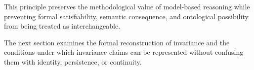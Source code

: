 This principle preserves the methodological value
of model-based reasoning while preventing formal
satisfiability, semantic consequence, and ontological
possibility from being treated as interchangeable.

The next section examines the formal reconstruction
of invariance and the conditions under which
invariance claims can be represented without
confusing them with identity, persistence, or
continuity.

